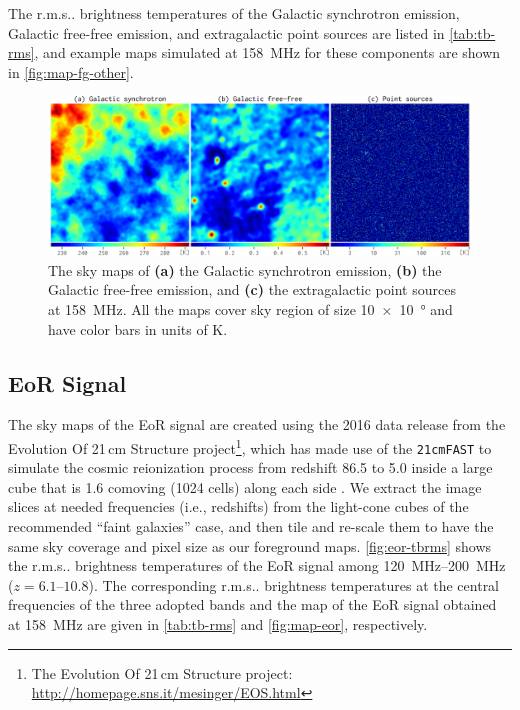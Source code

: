 \documentclass[twocolumn]{aastex62}
\makeatletter
\newcommand{\rms}{r.m.s\@ifnextchar.{}{.\@}}
\makeatother
\begin{document}
The \rms{} brightness temperatures of the Galactic synchrotron emission,
Galactic free-free emission, and extragalactic point sources are listed
in \autoref{tab:tb-rms}, and example maps simulated at \SI{158}{\MHz}
for these components are shown in \autoref{fig:map-fg-other}.

\begin{figure}
  \centering
  \includegraphics[width=\textwidth]{foregrounds-f158}
  \caption{\label{fig:map-fg-other}%
    The sky maps of
    \textbf{(a)} the Galactic synchrotron emission,
    \textbf{(b)} the Galactic free-free emission, and
    \textbf{(c)} the extragalactic point sources
    at \SI{158}{\MHz}.
    All the maps cover sky region of size
    \SI[product-units=repeat]{10 x 10}{\degree}
    and have color bars in units of \si{\kelvin}.
  }
\end{figure}


\subsection{EoR Signal}
\label{sec:eor-signal}

The sky maps of the EoR signal are created using the 2016 data release
from the Evolution Of 21\,cm Structure project\footnote{%
  The Evolution Of 21\,cm Structure project:
  \url{http://homepage.sns.it/mesinger/EOS.html}},
which has made use of the \texttt{21cmFAST} to simulate the cosmic
reionization process from redshift 86.5 to 5.0 inside a large cube that is
1.6 comoving \si{\Gpc} (1024 cells) along each side \citep{mesinger2016}.
We extract the image slices at needed frequencies (i.e., redshifts) from
the light-cone cubes of the recommended \enquote{faint galaxies} case,
and then tile and re-scale them to have the same sky coverage and
pixel size as our foreground maps.
\autoref{fig:eor-tbrms} shows the \rms{} brightness temperatures of the
EoR signal among \SIrange{120}{200}{\MHz} ($z = \numrange{6.1}{10.8}$).
The corresponding \rms{} brightness temperatures at the central
frequencies of the three adopted bands and the map of the EoR signal
obtained at \SI{158}{\MHz} are given in \autoref{tab:tb-rms} and
\autoref{fig:map-eor}, respectively.
\end{document}
